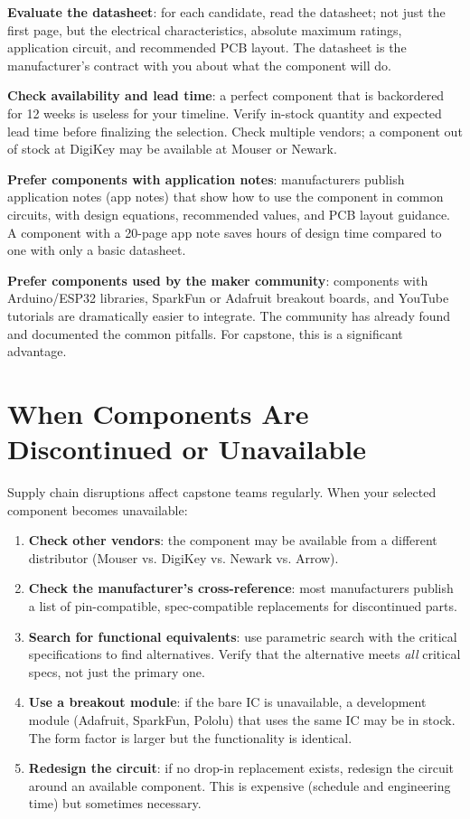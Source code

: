 \textbf{Evaluate the datasheet}: for each candidate, read the datasheet; not just the first page, but the electrical characteristics, absolute maximum ratings, application circuit, and recommended PCB layout. The datasheet is the manufacturer's contract with you about what the component will do.

\textbf{Check availability and lead time}: a perfect component that is backordered for 12 weeks is useless for your timeline. Verify in-stock quantity and expected lead time before finalizing the selection. Check multiple vendors; a component out of stock at DigiKey may be available at Mouser or Newark.

\textbf{Prefer components with application notes}: manufacturers publish application notes (app notes) that show how to use the component in common circuits, with design equations, recommended values, and PCB layout guidance. A component with a 20-page app note saves hours of design time compared to one with only a basic datasheet.

\textbf{Prefer components used by the maker community}: components with Arduino/ESP32 libraries, SparkFun or Adafruit breakout boards, and YouTube tutorials are dramatically easier to integrate. The community has already found and documented the common pitfalls. For capstone, this is a significant advantage.

\section{When Components Are Discontinued or Unavailable}
Supply chain disruptions affect capstone teams regularly. When your selected component becomes unavailable:

\begin{enumerate}[nosep,leftmargin=1.5em]
\item \textbf{Check other vendors}: the component may be available from a different distributor (Mouser vs. DigiKey vs. Newark vs. Arrow).
\item \textbf{Check the manufacturer's cross-reference}: most manufacturers publish a list of pin-compatible, spec-compatible replacements for discontinued parts.
\item \textbf{Search for functional equivalents}: use parametric search with the critical specifications to find alternatives. Verify that the alternative meets \emph{all} critical specs, not just the primary one.
\item \textbf{Use a breakout module}: if the bare IC is unavailable, a development module (Adafruit, SparkFun, Pololu) that uses the same IC may be in stock. The form factor is larger but the functionality is identical.
\item \textbf{Redesign the circuit}: if no drop-in replacement exists, redesign the circuit around an available component. This is expensive (schedule and engineering time) but sometimes necessary.
\end{enumerate}

